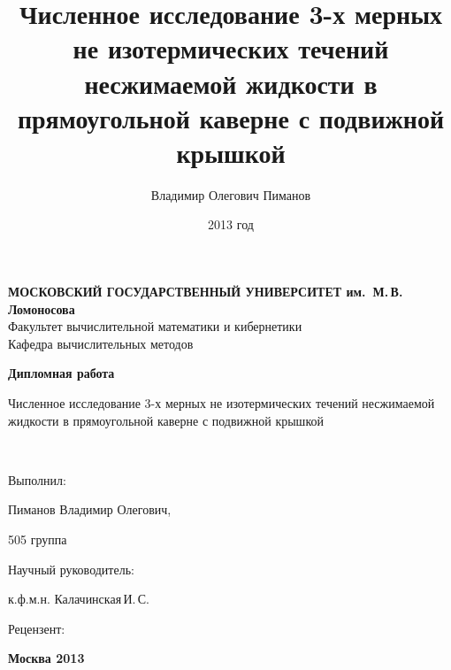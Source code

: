 \documentclass{scrartcl}
\title{Численное исследование 3-х мерных не изотермических течений несжимаемой жидкости в прямоугольной каверне с подвижной крышкой}
\author{Владимир Олегович Пиманов}
\date{2013 год}
\begin{document}

\thispagestyle{empty}
\begin{center}
{\bfseries МОСКОВСКИЙ ГОСУДАРСТВЕННЫЙ УНИВЕРСИТЕТ им.~М.{\,}В.{\,}Ломоносова}\\
\vspace{2ex}Факультет вычислительной математики и кибернетики \\
\vspace{2ex}Кафедра вычислительных методов \\
\end{center}

\vfill

\begin{center}
{\huge {\bfseries Дипломная работа

\vspace*{1cm}

Численное исследование 3-х мерных не изотермических течений несжимаемой жидкости в прямоугольной каверне с подвижной крышкой} \\[25mm]}

\end{center}

\vfill 

\hspace*{7cm} Выполнил:

\hspace*{7cm} Пиманов Владимир Олегович,

\hspace*{7cm} 505 группа

\hspace*{7cm} Научный руководитель:

\hspace*{7cm} к.ф.м.н. Калачинская{\,}И.{\,}С.

\hspace*{7cm} Рецензент:

\hspace*{7cm} 

\bigskip

\vfill

\begin{center}
{\bfseries Москва 2013}
\end{center}

\newpage
\tableofcontents
\newpage
\end{document}
